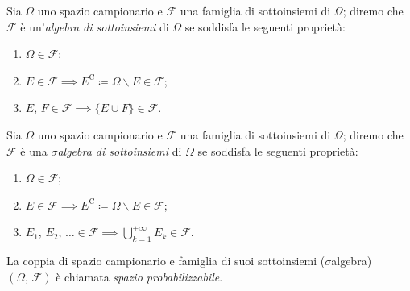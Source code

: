         \begin{defn}
            Sia $\Omega$ uno spazio campionario e $\mathscr{F}$ una famiglia di sottoinsiemi di $\Omega$; diremo che $\mathscr{F}$ è un'\textit{algebra di sottoinsiemi} di $\Omega$ se soddisfa le seguenti proprietà:
            \begin{enumerate}
                \item $\Omega \in \mathscr{F}$;
                \item $E \in \mathscr{F} \implies E^{\text{C}} \coloneqq \Omega \backslash E \in \mathscr{F}$;
                \item $E,\,F \in \mathscr{F} \implies \{E \cup F\} \in \mathscr{F}$.
            \end{enumerate}
        \end{defn}
        \begin{defn}
            Sia $\Omega$ uno spazio campionario e $\mathscr{F}$ una famiglia di sottoinsiemi di $\Omega$; diremo che $\mathscr{F}$ è una \textit{$\sigma$\nbdash algebra di sottoinsiemi} di $\Omega$ se soddisfa le seguenti proprietà:
            \begin{enumerate}
                \item $\Omega \in \mathscr{F}$;
                \item $E \in \mathscr{F} \implies E^{\text{C}} \coloneqq \Omega \backslash E \in \mathscr{F}$;
                \item $E_1,\,E_2,\,\ldots \in \mathscr{F} \implies \bigcup_{k=1}^{+\infty}E_k \in \mathscr{F}$.
            \end{enumerate}
        \end{defn}
        \begin{defn}
            La coppia di spazio campionario e famiglia di suoi sottoinsiemi ($\sigma$\nbdash algebra) $(\Omega,\,\mathscr{F})$ è chiamata \textit{spazio probabilizzabile}.
        \end{defn}
